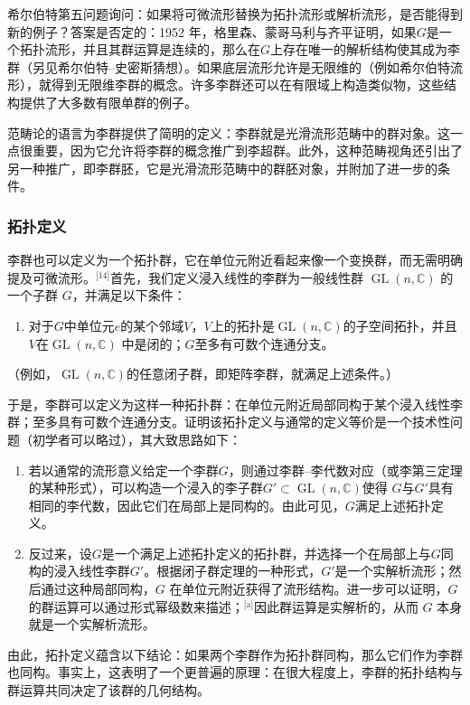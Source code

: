 希尔伯特第五问题询问：如果将可微流形替换为拓扑流形或解析流形，是否能得到新的例子？答案是否定的：1952 年，格里森、蒙哥马利与齐平证明，如果$G$是一个拓扑流形，并且其群运算是连续的，那么在$G$上存在唯一的解析结构使其成为李群（另见希尔伯特–史密斯猜想）。如果底层流形允许是无限维的（例如希尔伯特流形），就得到无限维李群的概念。许多李群还可以在有限域上构造类似物，这些结构提供了大多数有限单群的例子。

范畴论的语言为李群提供了简明的定义：李群就是光滑流形范畴中的群对象。这一点很重要，因为它允许将李群的概念推广到李超群。此外，这种范畴视角还引出了另一种推广，即李群胚，它是光滑流形范畴中的群胚对象，并附加了进一步的条件。
\subsubsection{拓扑定义}
李群也可以定义为一个拓扑群，它在单位元附近看起来像一个变换群，而无需明确提及可微流形。\(^\text{[14]}\)首先，我们定义浸入线性的李群为一般线性群 $\operatorname{GL}(n,\mathbb{C})$ 的一个子群 $G$，并满足以下条件：
\begin{enumerate}
\item 对于$G$中单位元$e$的某个邻域$V$，$V$上的拓扑是$\operatorname{GL}(n,\mathbb{C})$的子空间拓扑，并且$V$在$\operatorname{GL}(n,\mathbb{C})$ 中是闭的；$G$至多有可数个连通分支。
\end{enumerate}
（例如，$\operatorname{GL}(n,\mathbb{C})$的任意闭子群，即矩阵李群，就满足上述条件。）

于是，李群可以定义为这样一种拓扑群：在单位元附近局部同构于某个浸入线性李群；至多具有可数个连通分支。证明该拓扑定义与通常的定义等价是一个技术性问题（初学者可以略过），其大致思路如下：
\begin{enumerate}
\item 若以通常的流形意义给定一个李群$G$，则通过李群–李代数对应（或李第三定理的某种形式），可以构造一个浸入的李子群$G' \subset \operatorname{GL}(n,\mathbb{C})$使得 $G$与$G'$具有相同的李代数，因此它们在局部上是同构的。由此可见，$G$满足上述拓扑定义。
\item 反过来，设$G$是一个满足上述拓扑定义的拓扑群，并选择一个在局部上与$G$同构的浸入线性李群$G'$。根据闭子群定理的一种形式，$G'$是一个实解析流形；然后通过这种局部同构，$G$ 在单位元附近获得了流形结构。进一步可以证明，$G$的群运算可以通过形式幂级数来描述；\(^\text{[a]}\)因此群运算是实解析的，从而 $G$ 本身就是一个实解析流形。
\end{enumerate}
由此，拓扑定义蕴含以下结论：如果两个李群作为拓扑群同构，那么它们作为李群也同构。事实上，这表明了一个更普遍的原理：在很大程度上，李群的拓扑结构与群运算共同决定了该群的几何结构。
